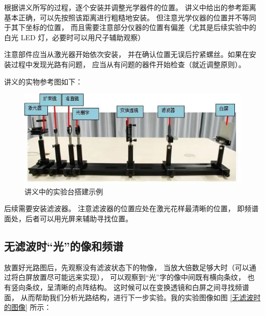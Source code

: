\documentclass[UTF8]{article}
\theoremstyle{MyLineTheoremStyle} %
\theoremstyle{MyBlockTheoremStyle} %
\theoremstyle{MySubsubsectionStyle} %
\begin{document}
根据讲义所写的过程，逐个安装并调整光学器件的位置。
讲义中给出的参考距离基本正确，可以先按照该距离进行粗糙地安装。
但注意光学仪器的位置并不等同于其下坐标的位置，
而且需要注意部分仪器的位置有偏差（尤其是后续实验中的白光 LED 灯，必要时可以用尺子辅助观察）

注意部件应当从激光器开始依次安装，
并在确认位置无误后拧紧螺丝。如果在安装过程中发现光路有问题，
应当从有问题的器件开始检查（就近调整原则）。

讲义的实物参考图如下：

\begin{figure}[H]\centering
    \includegraphics[width=0.8\columnwidth]{assets/1 阿贝尔/讲义实验台.png}
    \caption{讲义中的实验台搭建示例}\label{讲义中的实验台搭建示例}
\end{figure}

后续需要安装滤波器。
注意滤波器的位置应处在激光花样最清晰的位置，
即频谱面处，后者可以用光屏来辅助寻找位置。


\subsection{无滤波时“光”的像和频谱}

放置好光路图后，先观察没有滤波状态下的物像，
当放大倍数足够大时（可以通过将白屏放置尽可能远来实现），
可以观察到“光”字的像中间既有横向条纹，
也有竖向条纹，呈清晰的点阵结构。
这时候可以在变换透镜和白屏之间寻找频谱面，
从而帮助我们分析光路结构，进行下一步实验。我的实验图像如图 \ref{无滤波时的图像} 所示：
\end{document}
